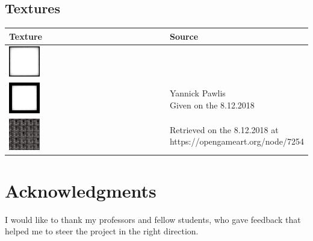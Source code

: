 \documentclass[a4paper, twoside, 10pt]{report}
\begin{document}
{\section{Textures}
\begin{centering}
\begin{tabular}{l|l}
Texture & Source \\
\hline
\includegraphics[width=0.2\textwidth]{Images/BlackBorder.png} &  \\
\includegraphics[width=0.2\textwidth]{Images/BlackThickBorder.png} & 
\makecell[l]{Yannick Pawlis \\ Given on the 8.12.2018} \\
\hline
\includegraphics[width=0.2\textwidth]{Images/airbase_radar_panels.jpg} & 
\makecell[l]{Retrieved on the 8.12.2018 at \\ \linebreak https://opengameart.org/node/7254}
\end{tabular}
\end{centering}






\listoffigures



\chapter*{Acknowledgments}
I would like to thank my professors and fellow students, who gave feedback that helped me to steer the project in the right direction.



}
\end{document}
